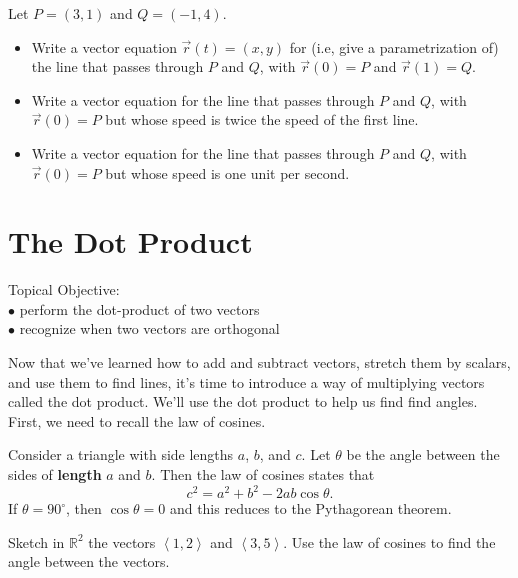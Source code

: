 
\begin{problem}\label{first line between two points}%
Let $P=(3,1)$ and $Q=(-1,4)$.  
\begin{itemize}
\item Write a vector equation $\vec r(t)=(x,y)$ for (i.e, give a parametrization of) the line that passes through $P$ and $Q$, with $\vec r(0)=P$ and $\vec r(1)=Q$.
\item Write a vector equation for the line that passes through $P$ and $Q$, with $\vec r(0)=P$ but whose speed is twice the speed of the first line.
\item Write a vector equation for the line that passes through $P$ and $Q$, with $\vec r(0)=P$ but whose speed is one unit per second.
\end{itemize}
\end{problem}


\uday
\section{The Dot Product}
\large Topical Objective: \normalsize\\
\indent $\bullet$ perform the dot-product of two vectors\\
\indent $\bullet$ recognize when two vectors are orthogonal

\vskip0.2in

Now that we've learned how to add and subtract vectors, stretch them by scalars, and use them to find lines, it's time to introduce a way of multiplying vectors called the dot product.  We'll use the dot product to help us find find angles. First, we need to recall the law of cosines.
\begin{theorem*}
Consider a triangle with side lengths $a$, $b$, and $c$. Let $\theta$ be the angle between the sides of \textbf{length} $a$ and $b$. Then the law of cosines states that 
$$c^2=a^2+b^2-2ab\cos\theta.$$
If $\theta=90^\circ$, then $\cos\theta=0$ and this reduces to the Pythagorean theorem.
\end{theorem*}

\begin{problem} 
%
Sketch in $\mathbb{R}^2$ the vectors $\left<1,2\right>$ and $\left<3,5\right>$.  Use the law of cosines to find the angle between the vectors.
\end{problem}


